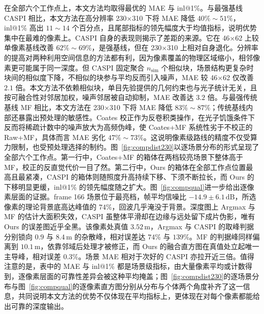 在全部六个工作点上，本文方法均取得最优的 MAE 与 inl@1\%。与最强基线 CASPI 相比，本文方法在高分辨率 230×310 下将 MAE 降低 $40\%\sim51\%$，inl@1\% 高出 $11\sim14$ 个百分点，且尾部指标的领先幅度大于均值指标，说明优势集中在最难的像素上。CASPI 自身的表现则揭示了差距的来源。它在 46×62 上较单像素基线改善 $62\%\sim69\%$，是强基线，但在 230×310 上相对自身退化。分辨率的提高对两种利用空间信息的方法都有利，因为像素覆盖的物理区域缩小，相邻像素更可能属于同一深度。但 CASPI 固定聚合 $n_{\mathrm{sim}}$ 个相似块，场景结构更复杂时块间的相似度下降，不相似的块参与平均反而引入噪声，MAE 较 46×62 仅改善 $2.1$ 倍。本文方法不依赖相似块，单目先验提供的几何约束也与光子统计无关，且按可融合性对邻居加权，噪声邻居被自动抑制，MAE 改善达 $3.2$ 倍。与最强传统基线 MF 相比，本文方法在 230×310 下将 MAE 降低 $83\%\sim87\%$；传统基线内部还暴露出预处理的敏感性。Coates 校正作为反卷积类操作，在光子饥饿条件下反而将稀疏计数中的噪声放大为高频伪峰，使 Coates+MF 系统性劣于不校正的 Raw+MF，具体而言 MAE 劣化 $47\%\sim73\%$。这说明像素级路线的精度不仅受算力限制，也受预处理选择的制约。图~\ref{fig:compdist230}以逐场景分布的形式呈现了全部六个工作点。第一行中，Coates+MF 的箱体在两档较亮场景下整体高于 MF，校正的反直觉代价一目了然。第二行中，Ours 的箱体在全部工作点位置最高且最紧凑，CASPI 的箱体则随照度升高持续下移、下须不断拉长，而 Ours 的下移明显更缓，inl@1\% 的领先幅度随之扩大。图~\ref{fig:compqual}进一步给出逐像素层面的证据。frame 166 场景位于最亮档，帧平均信噪比 $-14.9 \pm 6.1\,\mathrm{dB}$，所选像素的理论背景底高达峰值的 $74\%$，回波几乎淹没于背景。深度图上 Argmax 与 MF 的估计大面积失效，CASPI 虽整体平滑却在边缘与远处留下成片伪影，唯有 Ours 的误差图近乎全黑。该像素处真值 $3.52\,\mathrm{m}$，Argmax 与 CASPI 的取峰判据分别锁向 $0.9$ 与 $8.4\,\mathrm{m}$ 的杂散峰，相对误差达 $74\%$ 与 $139\%$。MF 的判据峰同样偏离到 $10.1\,\mathrm{m}$，依靠邻域后处理才被修正，而 Ours 的融合直方图在真值处立起唯一主导峰，相对误差 $0.3\%$。场景 MAE 相对于次好的 CASPI 亦拉开近三倍。值得注意的是，表中的 MAE 与 inl@1\% 都是场景级指标，由大量像素平均或计数得到，逐像素层面的可靠性差异会被这种平均掩盖；图~\ref{fig:compdist230}的逐场景分布与图~\ref{fig:compqual}的逐像素直方图分别从分布与个体两个角度补齐了这一信息，共同说明本文方法的优势不仅体现在平均指标上，更体现在对每个像素都能给出可靠的深度输出。

